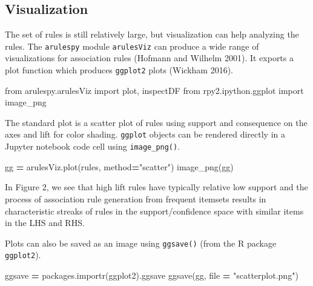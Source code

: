 \documentclass{article}
\newenvironment{Shaded}{\begin{snugshade}}{\end{snugshade}}
\newcommand{\BuiltInTok}[1]{#1}
\newcommand{\ImportTok}[1]{#1}
\newcommand{\NormalTok}[1]{#1}
\newcommand{\OperatorTok}[1]{\textcolor[rgb]{0.81,0.36,0.00}{\textbf{#1}}}
\newcommand{\StringTok}[1]{\textcolor[rgb]{0.31,0.60,0.02}{#1}}
\begin{document}
\hypertarget{visualization}{%
\subsection{Visualization}\label{visualization}}

The set of rules is still relatively large, but visualization can help
analyzing the rules. The \texttt{arulespy} module \texttt{arulesViz} can
produce a wide range of visualizations for association rules (Hofmann
and Wilhelm 2001). It exports a plot function which produces
\texttt{ggplot2} plots (Wickham 2016).

\begin{Shaded}
\begin{Highlighting}[]
\ImportTok{from}\NormalTok{ arulespy.arulesViz }\ImportTok{import}\NormalTok{ plot, inspectDF}
\ImportTok{from}\NormalTok{ rpy2.ipython.ggplot }\ImportTok{import}\NormalTok{ image\_png}
\end{Highlighting}
\end{Shaded}

The standard plot is a scatter plot of rules using support and
consequence on the axes and lift for color shading. \texttt{ggplot}
objects can be rendered directly in a Jupyter notebook code cell using
\texttt{image\_png()}.

\begin{Shaded}
\begin{Highlighting}[]
\NormalTok{gg }\OperatorTok{=}\NormalTok{ arulesViz.plot(rules, method}\OperatorTok{=}\StringTok{"scatter"}\NormalTok{)}
\NormalTok{image\_png(gg)}
\end{Highlighting}
\end{Shaded}

In Figure 2, we see that high lift rules have typically relative low
support and the process of association rule generation from frequent
itemsets results in characteristic streaks of rules in the
support/confidence space with similar items in the LHS and RHS.

Plots can also be saved as an image using \texttt{ggsave()} (from the R
package \texttt{ggplot2}).

\begin{Shaded}
\begin{Highlighting}[]
\NormalTok{ggsave }\OperatorTok{=}\NormalTok{ packages.importr(}\StringTok{\textquotesingle{}ggplot2\textquotesingle{}}\NormalTok{).ggsave}
\NormalTok{ggsave(gg, }\BuiltInTok{file} \OperatorTok{=} \StringTok{"scatterplot.png"}\NormalTok{)}
\end{Highlighting}
\end{Shaded}
\end{document}
